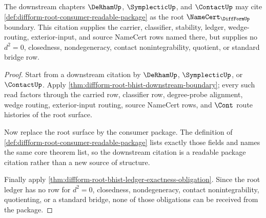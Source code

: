 \begin{theorem}
\label{thm:diffform-root-consumer-namecert-boundary}
The downstream chapters $\DeRhamUp$, $\SymplecticUp$, and $\ContactUp$ may
cite \autoref{def:diffform-root-consumer-readable-package} as the root
$\NameCert_{\DiffFormUp}$ boundary. This citation supplies the carrier,
classifier, stability, ledger, wedge-routing, exterior-input, and source
NameCert rows named there, but supplies no $d^2=0$, closedness,
nondegeneracy, contact nonintegrability, quotient, or standard bridge row.
\end{theorem}
\begin{proof}
Start from a downstream citation by $\DeRhamUp$, $\SymplecticUp$, or
$\ContactUp$. Apply
\autoref{thm:diffform-root-bhist-downstream-boundary}; every such read
factors through the carried row, classifier row, degree-probe alignment,
wedge routing, exterior-input routing, source NameCert rows, and $\Cont$
route histories of the root surface.

Now replace the root surface by the consumer package. The definition of
\autoref{def:diffform-root-consumer-readable-package} lists exactly those
fields and names the same core theorem list, so the downstream citation is a
readable package citation rather than a new source of structure.

Finally apply
\autoref{thm:diffform-root-bhist-ledger-exactness-obligation}. Since the
root ledger has no row for $d^2=0$, closedness, nondegeneracy, contact
nonintegrability, quotienting, or a standard bridge, none of those
obligations can be received from the package.
\end{proof}
